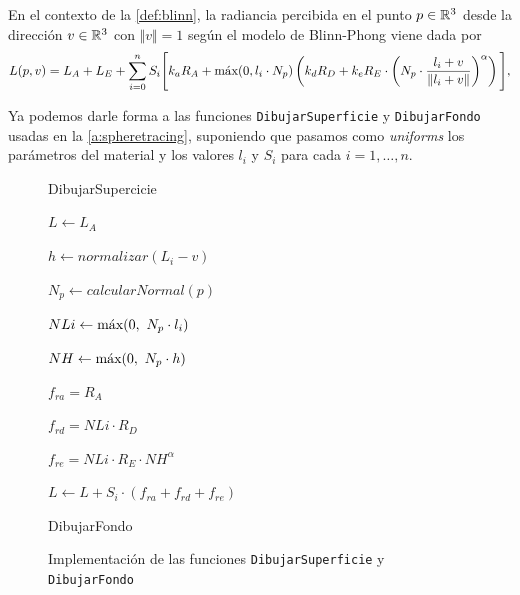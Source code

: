 \begin{definicion}
    En el contexto de la \autoref{def:blinn}, la radiancia percibida en el punto $p\in\R^3$ desde la dirección $v\in\R^3$ con $\Vert v \Vert = 1$ según el modelo de Blinn-Phong viene dada por
    \begin{equation*}
        L(p,v) = L_A+L_E+ \sum_{i=0}^n S_i \Bigg[ k_aR_A + \Max(0,l_i\cdot N_p) \left( k_dR_D + k_eR_E\cdot \left(N_p\cdot \frac{l_i + v}{\Vert l_i + v\Vert} \right)^{\alpha} \right) \Bigg],
    \end{equation*}
\end{definicion}

Ya podemos darle forma a las funciones \texttt{DibujarSuperficie} y \texttt{DibujarFondo} usadas en la \autoref{a:spheretracing}, suponiendo que pasamos como \textit{uniforms} los parámetros del material y los valores $l_i$ y $S_i$ para cada $i=1,\dots, n$.
\begin{figure}[ht!]
    \centering
    
       \begin{algorithm}[H]
            \caption{DibujarSupercicie}
                $L \gets L_A$ 
                 {

                    
                    $h \gets normalizar(L_i - v)$ 
                    
                    $N_p \gets calcularNormal(p)$
                    
                    $NLi \gets \Max(0,\ N_p\cdot l_i)$
                    
                    $NH \gets \Max(0,\ N_p \cdot h)$\newline

                    $f_{ra} = R_A$
                    
                    $f_{rd} = NLi\cdot R_D$
                    
                    $f_{re} = NLi \cdot R_E \cdot NH^{\alpha}$\newline

                    $L \gets L + S_i\cdot (f_{ra} + f_{rd} + f_{re})$
                }

        \end{algorithm}
    \begin{algorithm}[H]
            \caption{DibujarFondo}
        \end{algorithm}

        \caption{Implementación de las funciones \texttt{DibujarSuperficie} y \texttt{DibujarFondo}}
\end{figure}

